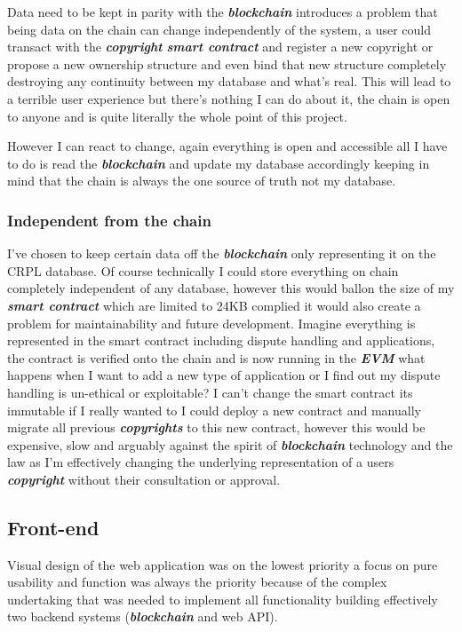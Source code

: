 \documentclass[12pt]{article}
\newcommand{\keyword}[1]{\textbf{\textit{#1}}}
\begin{document}
Data need to be kept in parity with the \keyword{blockchain} introduces a problem that being data on the chain can change independently of the system, a user could transact with the \keyword{copyright} \keyword{smart contract} and register a new copyright or propose a new ownership structure and even bind that new structure completely destroying any continuity between my database and what's real. This will lead to a terrible user experience but there's nothing I can do about it, the chain is open to anyone and is quite literally the whole point of this project.

However I can react to change, again everything is open and accessible all I have to do is read the \keyword{blockchain} and update my database accordingly keeping in mind that the chain is always the one source of truth not my database.

\subsubsection{Independent from the chain}

I've chosen to keep certain data off the \keyword{blockchain} only representing it on the CRPL database. Of course technically I could store everything on chain completely independent of any database, however this would ballon the size of my \keyword{smart contract} which are limited to 24KB complied it would also create a problem for maintainability and future development. 
Imagine everything is represented in the smart contract including dispute handling and applications, the contract is verified onto the chain and is now running in the \keyword{EVM} what happens when I want to add a new type of application or I find out my dispute handling is un-ethical or exploitable? I can't change the smart contract its immutable if I really wanted to I could deploy a new contract and manually migrate all previous \keyword{copyrights} to this new contract, however this would be expensive, slow and arguably against the spirit of \keyword{blockchain} technology and the law as I'm effectively changing the underlying representation of a users \keyword{copyright} without their consultation or approval.

\subsection{Front-end}

Visual design of the web application was on the lowest priority a focus on pure usability and function was always the priority because of the complex undertaking that was needed to implement all functionality building effectively two backend systems (\keyword{blockchain} and web API).
\end{document}
